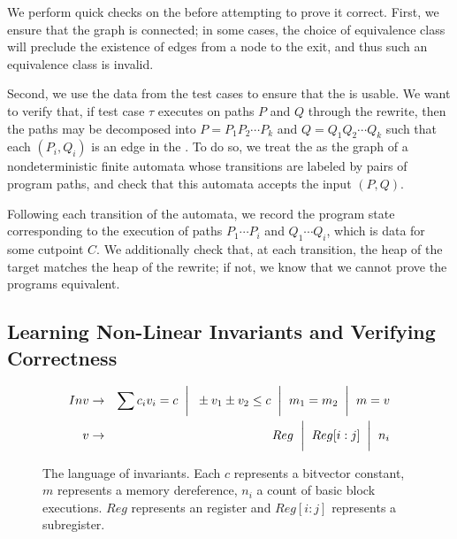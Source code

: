 We perform quick checks on the \bisimrep{} before attempting to prove
it correct. First, we ensure that the graph is connected; in some
cases, the choice of equivalence class will preclude the existence of
edges from a node to the exit, and thus such an equivalence class is
invalid.

Second, we use the data from the test cases to ensure that the
\bisimrep{} is usable. We want to verify that, if test case $\tau$
executes on paths $P$ and $Q$ through the rewrite, then the paths
may be decomposed into $P = P_1P_2\dotsm P_k$ and $Q = Q_1Q_2\dotsm
Q_k$ such that each $(P_i, Q_i)$ is an edge in the \bisimrep. To do
so, we treat the \bisimrep as the graph of a nondeterministic finite
automata whose transitions are labeled by pairs of program paths, and
check that this automata accepts the input $(P, Q)$. 

Following each transition of the automata, we record the program state
corresponding to the execution of paths $P_1\dotsm P_i$ and $Q_1
\dotsm Q_i$, which is data for some cutpoint $C$. We additionally
check that, at each transition, the heap of the target matches the
heap of the rewrite; if not, we know that we cannot prove the programs
equivalent.

\subsection{Learning Non-Linear Invariants and Verifying Correctness} \label{algstep6}

\begin{figure}
\begin{eqnarray*}
Inv &\rightarrow& \sum c_iv_i = c \hspace{2mm}\bigg|\hspace{2mm} \pm v_1 \pm v_2 \leq c \hspace{2mm}\bigg|\hspace{2mm} m_1 = m_2 \hspace{2mm}\bigg|\hspace{2mm} m = v\\
v   &\rightarrow& Reg \hspace{2mm}\bigg|\hspace{2mm}  Reg[i:j]  \hspace{2mm}\bigg|\hspace{2mm} n_i\\
\end{eqnarray*}
\caption{The language of invariants.  Each $c$ represents a bitvector constant, $m$ represents a memory dereference, $n_i$ a count of basic block executions.  $Reg$ represents an \arch{} register and $Reg[i:j]$ represents a subregister.}
\end{figure}
